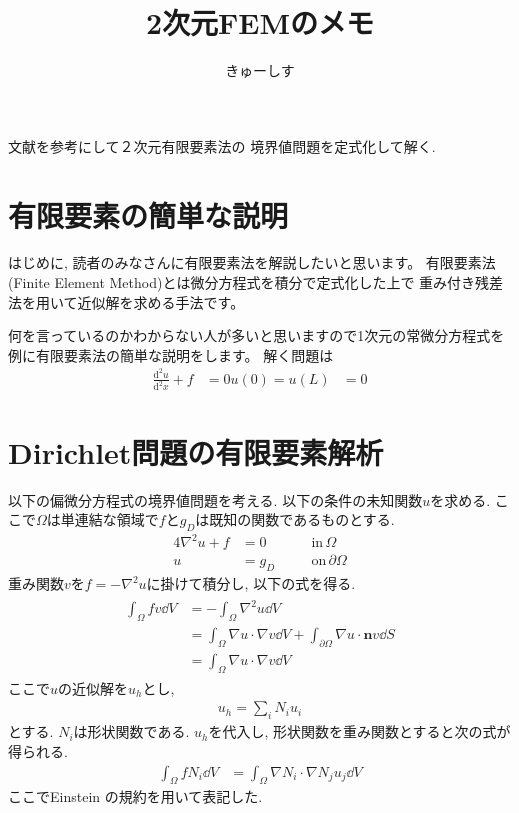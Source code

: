 \documentclass[paper=a4]{jlreq}
\begin{document}
\title{2次元FEMのメモ}
\author{きゅーしす}
\date{}
\maketitle

文献\cite{Larson2013}を参考にして２次元有限要素法の
境界値問題を定式化して解く.

\section{有限要素の簡単な説明}
はじめに, 読者のみなさんに有限要素法を解説したいと思います。
有限要素法 (Finite Element Method)とは微分方程式を積分で定式化した上で
重み付き残差法を用いて近似解を求める手法です。

何を言っているのかわからない人が多いと思いますので1次元の常微分方程式を
例に有限要素法の簡単な説明をします。
解く問題は
\begin{align}
    \frac{\mathrm{d}^2u}{\mathrm{d}^2x} +f &=0 \label{eq:ode}
    u(0) = u(L) &= 0 \label{eq:ode:bc}
\end{align}

\section{Dirichlet問題の有限要素解析}
以下の偏微分方程式の境界値問題を考える.
以下の条件の未知関数$u$を求める. 
ここで$\Omega$は単連結な領域で$f$と$g_D$は既知の関数であるものとする.
\begin{alignat}{4}
    \nabla^2 u + f &= 0 &\quad& \mathrm{in}\, \Omega \label{eq:poisson}\\
    u &= g_D &\quad& \mathrm{on}\, \partial\Omega \label{eq:dirichlet_bc}
\end{alignat}
重み関数$v$を$f = -\nabla^2 u$に掛けて積分し, 以下の式を得る.
\begin{align}
    \begin{split}
        \int_\Omega fv\dd{V} &= -\int_\Omega \nabla^2 u \dd{V} \\
        &= \int_\Omega \nabla u\cdot \nabla v \dd{V} 
        + \int_{\partial\Omega} \nabla u \cdot \bm{n} v \dd{S} \\
        &=  \int_\Omega \nabla u\cdot \nabla v \dd{V}
    \end{split}
\end{align}
ここで$u$の近似解を$u_h$とし, 
\begin{align}
    u_h = \sum_iN_iu_i
\end{align}
とする. $N_i$は形状関数である.
$u_h$を代入し, 形状関数を重み関数とすると次の式が得られる.
\begin{align}
    \int_\Omega fN_i\dd{V} &=  \int_\Omega \nabla N_i \cdot \nabla N_j u_j \dd{V} \label{eq:weak_form}
\end{align}
ここでEinstein の規約を用いて表記した.
\end{document}
